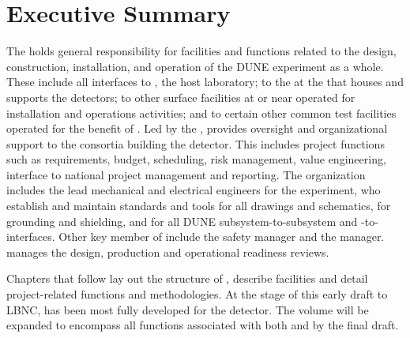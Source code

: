 \chapter{Executive Summary}
\label{vl:tc-execsum}


The   holds general responsibility for
facilities and functions related to the design, construction,
installation, and operation of the DUNE experiment as a whole. These
include all interfaces to \fnal, the host laboratory; to the
 at the  that houses and supports the
 detectors; to other surface facilities at or near \surf
operated for installation and operations activities; and to certain
other common test facilities operated for the benefit of
. Led by the  , 
 provides oversight and organizational support to the
consortia building the  detector.  This includes project
functions such as requirements, budget, scheduling, risk management,
value engineering, interface to national project management and
reporting. The  organization includes the lead
mechanical and electrical engineers for the experiment, who establish
and maintain standards and tools for all drawings and schematics, for
grounding and shielding, and for all DUNE subsystem-to-subsystem and
-to- interfaces. Other key member of
 include the  safety manager and the
  manager.   manages
the design, production and operational readiness reviews.

Chapters that follow lay out the structure of 
, describe  facilities and detail
project-related functions and methodologies. At the stage of this
early draft to LBNC,   has been most fully
developed for the  detector. The volume will be expanded to
encompass all functions associated with both  and
 by the final draft.

